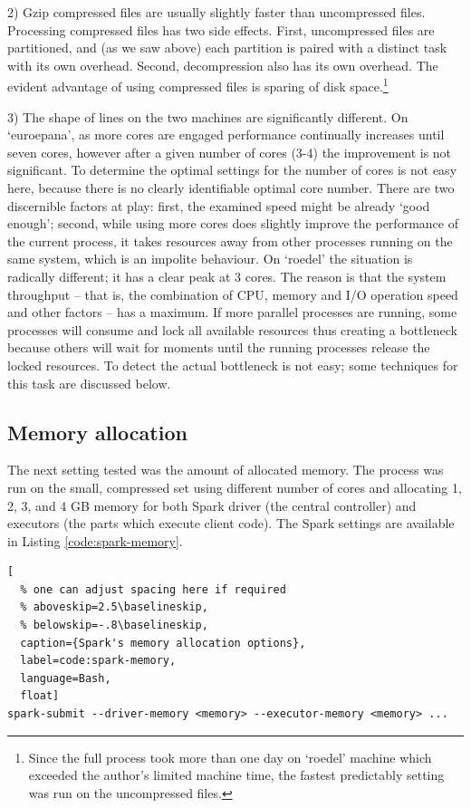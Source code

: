 2) Gzip compressed files are usually slightly faster than uncompressed files. Processing compressed files has two side effects. First, uncompressed files are partitioned, and (as we saw above) each partition is paired with a distinct task with its own overhead. Second, decompression also has its own overhead. The evident advantage of using compressed files is sparing of disk space.\footnote{Since the full process took more than one day on `roedel' machine which exceeded the author's limited machine time, the fastest predictably setting was run on the uncompressed files.}

3) The shape of lines on the two machines are significantly different. On `euroepana', as more cores are engaged performance continually increases until seven cores, however after a given number of cores (3-4) the improvement is not significant. To determine the optimal settings for the number of cores is not easy here, because there is no clearly identifiable optimal core number. There are two discernible factors at play: first, the examined speed might be already `good enough'; second, while using more cores does slightly improve the performance of the current process, it takes resources away from other processes running on the same system, which is an impolite behaviour. On `roedel' the situation is radically different; it has a clear peak at 3 cores. The reason is that the system throughput -- that is, the combination of CPU, memory and I/O operation speed and other factors -- has a maximum. If more parallel processes are running, some processes will consume and lock all available resources thus creating a bottleneck because others will wait for moments until the running processes release the locked resources. To detect the actual bottleneck is not easy; some techniques for this task are discussed below.

\subsection{Memory allocation}

The next setting tested was the amount of allocated memory. The process was run on the small, compressed set using different number of cores and allocating 1, 2, 3, and 4 GB memory for both Spark driver (the central controller) and executors (the parts which execute client code). The Spark settings are available in Listing \ref{code:spark-memory}.

\begin{lstlisting}[
  % one can adjust spacing here if required
  % aboveskip=2.5\baselineskip,
  % belowskip=-.8\baselineskip,
  caption={Spark's memory allocation options},
  label=code:spark-memory,
  language=Bash,
  float]
spark-submit --driver-memory <memory> --executor-memory <memory> ...
\end{lstlisting}

